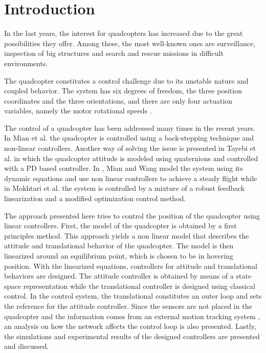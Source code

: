 \section{Introduction}
In the last years, the interest for quadcopters has increased due to the great possibilities they offer. Among these, the most well-known ones are surveillance, inspection of big structures and search and rescue missions in difficult environments. \cite{droneuses}

The quadcopter constitutes a control challenge due to its unstable nature and coupled behavior. The system has six degrees of freedom, the three position coordinates and the three orientations, and there are only four actuation variables, namely the motor rotational speeds \cite{draganflyer}.

The control of a quadcopter has been addressed many times in the recent years. In Mian et al. \cite{backstepping} the quadcopter is controlled using a back-stepping technique and non-linear controllers. Another way of solving the issue is presented in Tayebi et al. \cite{quaternionsPD} in which the quadcopter attitude is modeled using quaternions and controlled with a PD based controller. In \cite{MianWang}, Mian and Wang model the system using its dynamic equations and use non linear controllers to achieve a steady flight while in Mokhtari et al. \cite{GHinf} the system is controlled by a mixture of a robust feedback linearization and a modified optimization control method.

The approach presented here tries to control the position of the quadcopter using linear controllers. First, the model of the quadcopter is obtained by a first principles method. This approach yields a non linear model that describes the attitude and translational behavior of the quadcopter. The model is then linearized around an equilibrium point, which is chosen to be in hovering position. 
%
With the linearized equations, controllers for attitude and translational behaviors are designed. The attitude controller is obtained by means of a state space representation while the translational controller is designed using classical control. In the control system, the translational constitutes an outer loop and sets the reference for the attitude controller.
%
Since the sensors are not placed in the quadcopter and the information comes from an external motion tracking system \cite{vicon}, an analysis on how the network affects the control loop is also presented.
%
Lastly, the simulations and experimental results of the designed controllers are presented and discussed.
